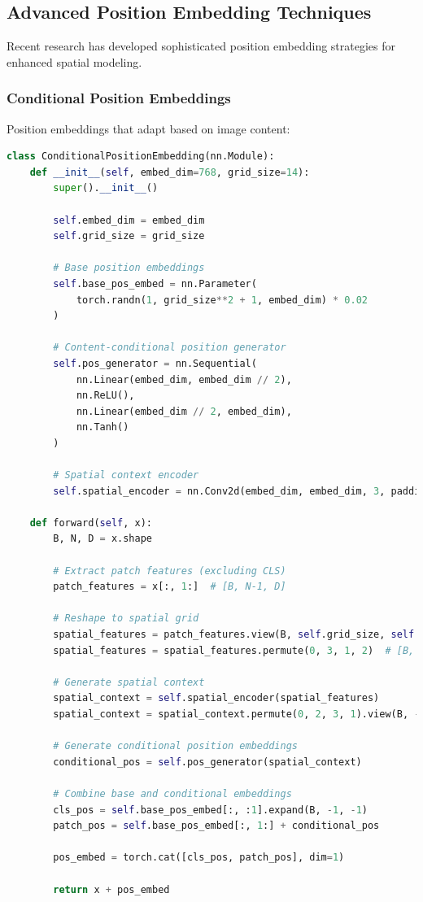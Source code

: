 \subsection{Advanced Position Embedding Techniques}

Recent research has developed sophisticated position embedding strategies for enhanced spatial modeling.

\subsubsection{Conditional Position Embeddings}

Position embeddings that adapt based on image content:

\begin{lstlisting}[language=Python, caption=Conditional position embeddings]
class ConditionalPositionEmbedding(nn.Module):
    def __init__(self, embed_dim=768, grid_size=14):
        super().__init__()
        
        self.embed_dim = embed_dim
        self.grid_size = grid_size
        
        # Base position embeddings
        self.base_pos_embed = nn.Parameter(
            torch.randn(1, grid_size**2 + 1, embed_dim) * 0.02
        )
        
        # Content-conditional position generator
        self.pos_generator = nn.Sequential(
            nn.Linear(embed_dim, embed_dim // 2),
            nn.ReLU(),
            nn.Linear(embed_dim // 2, embed_dim),
            nn.Tanh()
        )
        
        # Spatial context encoder
        self.spatial_encoder = nn.Conv2d(embed_dim, embed_dim, 3, padding=1)
    
    def forward(self, x):
        B, N, D = x.shape
        
        # Extract patch features (excluding CLS)
        patch_features = x[:, 1:]  # [B, N-1, D]
        
        # Reshape to spatial grid
        spatial_features = patch_features.view(B, self.grid_size, self.grid_size, D)
        spatial_features = spatial_features.permute(0, 3, 1, 2)  # [B, D, H, W]
        
        # Generate spatial context
        spatial_context = self.spatial_encoder(spatial_features)
        spatial_context = spatial_context.permute(0, 2, 3, 1).view(B, -1, D)
        
        # Generate conditional position embeddings
        conditional_pos = self.pos_generator(spatial_context)
        
        # Combine base and conditional embeddings
        cls_pos = self.base_pos_embed[:, :1].expand(B, -1, -1)
        patch_pos = self.base_pos_embed[:, 1:] + conditional_pos
        
        pos_embed = torch.cat([cls_pos, patch_pos], dim=1)
        
        return x + pos_embed
\end{lstlisting}


